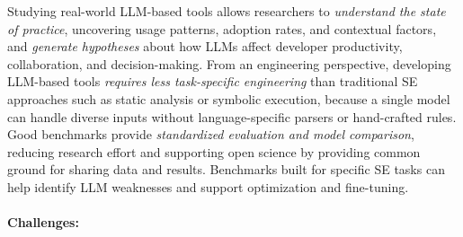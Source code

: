 \documentclass[smallextended]{svjour3}
\newcommand{\studytypeparagraph}[1]{\paragraph{\bfseries #1:}}
\newcommand{\studytypeparagraph}[1]{\subsubsection{#1}}
\begin{document}
Studying real-world LLM-based tools allows researchers to \emph{understand the state of practice}, uncovering usage patterns, adoption rates, and contextual factors, and \emph{generate hypotheses} about how LLMs affect developer productivity, collaboration, and decision-making. From an engineering perspective, developing LLM-based tools \emph{requires less task-specific engineering} than traditional SE approaches such as static analysis or symbolic execution, because a single model can handle diverse inputs without language-specific parsers or hand-crafted rules. Good benchmarks provide \emph{standardized evaluation and model comparison}, reducing research effort and supporting open science by providing common ground for sharing data and results. Benchmarks built for specific SE tasks can help identify LLM weaknesses and support optimization and fine-tuning.

\studytypeparagraph{Challenges}
\end{document}
